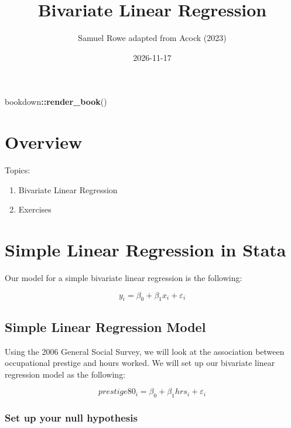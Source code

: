 \documentclass[
]{book}
\title{Bivariate Linear Regression}
\author{Samuel Rowe adapted from Acock (2023)}
\date{2026-11-17}
\newenvironment{Shaded}{\begin{snugshade}}{\end{snugshade}}
\newcommand{\FunctionTok}[1]{\textcolor[rgb]{0.13,0.29,0.53}{\textbf{#1}}}
\newcommand{\NormalTok}[1]{#1}
\newcommand{\SpecialCharTok}[1]{\textcolor[rgb]{0.81,0.36,0.00}{\textbf{#1}}}
\providecommand{\tightlist}{%
  \setlength{\itemsep}{0pt}\setlength{\parskip}{0pt}}
\begin{document}
\maketitle

{
\setcounter{tocdepth}{1}
\tableofcontents
}
\begin{Shaded}
\begin{Highlighting}[]
\NormalTok{bookdown}\SpecialCharTok{::}\FunctionTok{render\_book}\NormalTok{()}
\end{Highlighting}
\end{Shaded}

\chapter*{Overview}\label{overview}

Topics:

\begin{enumerate}
\def\labelenumi{\arabic{enumi}.}
\tightlist
\item
  Bivariate Linear Regression
\item
  Exercises
\end{enumerate}

\chapter{Simple Linear Regression in Stata}\label{simple-linear-regression-in-stata}

Our model for a simple bivariate linear regression is the following:

\[ y_i = \beta_0 + \beta_1 x_i + \varepsilon_i\]

\section{Simple Linear Regression Model}\label{simple-linear-regression-model}

Using the 2006 General Social Survey, we will look at the association between occupational prestige and hours worked. We will set up our bivariate linear regression model as the following:

\[ prestige80_i=\beta_0 + \beta_1 hrs_i + \varepsilon_i \]

\subsection{Set up your null hypothesis}\label{set-up-your-null-hypothesis}
\end{document}
